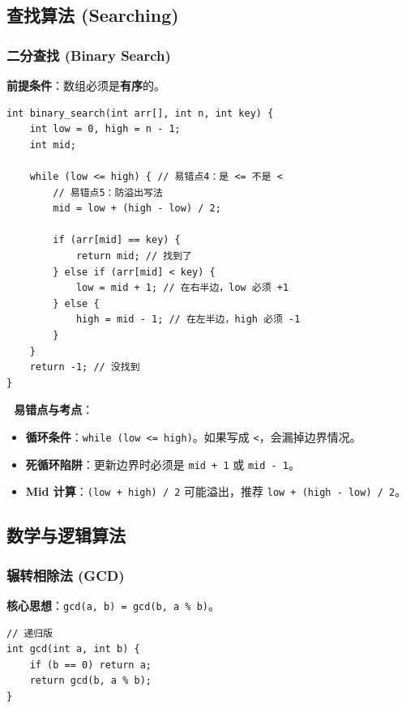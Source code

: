 \documentclass[a4paper,12pt]{article}
\begin{document}
\subsection{查找算法 (Searching)}

\subsubsection{二分查找 (Binary Search)}
\textbf{前提条件}：数组必须是\textbf{有序}的。

\begin{lstlisting}
int binary_search(int arr[], int n, int key) {
    int low = 0, high = n - 1;
    int mid;
    
    while (low <= high) { // 易错点4：是 <= 不是 <
        // 易错点5：防溢出写法
        mid = low + (high - low) / 2; 
        
        if (arr[mid] == key) {
            return mid; // 找到了
        } else if (arr[mid] < key) {
            low = mid + 1; // 在右半边，low 必须 +1
        } else {
            high = mid - 1; // 在左半边，high 必须 -1
        }
    }
    return -1; // 没找到
}
\end{lstlisting}

\textbf{🔴 易错点与考点}：
\begin{itemize}
    \item \textbf{循环条件}：\texttt{while (low <= high)}。如果写成 \texttt{<}，会漏掉边界情况。
    \item \textbf{死循环陷阱}：更新边界时必须是 \texttt{mid + 1} 或 \texttt{mid - 1}。
    \item \textbf{Mid 计算}：\texttt{(low + high) / 2} 可能溢出，推荐 \texttt{low + (high - low) / 2}。
\end{itemize}

\subsection{数学与逻辑算法}

\subsubsection{辗转相除法 (GCD)}
\label{sec:gcd}
\textbf{核心思想}：\texttt{gcd(a, b) = gcd(b, a \% b)}。

\begin{lstlisting}
// 递归版
int gcd(int a, int b) {
    if (b == 0) return a;
    return gcd(b, a % b);
}
\end{lstlisting}
\end{document}
